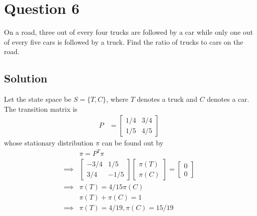 \section*{Question 6}

On a road, three out of every four trucks are followed by a car while only one out of every five cars is followed by a truck.
Find the ratio of trucks to cars on the road.

\subsection*{Solution}

Let the state space be \( S = \{ T, C \} \), where \( T \) denotes a truck and \( C \) denotes a car.
The transition matrix is
\begin{align*}
    P
     & =
    \begin{bmatrix}
        1/4 & 3/4 \\
        1/5 & 4/5
    \end{bmatrix}
\end{align*}
whose stationary distribution \( \pi \) can be found out by
\begin{align*}
     &
    \pi
    =
    P^T \pi
    \\
    \implies
     &
    \begin{bmatrix}
        -3/4 & 1/5  \\
        3/4  & -1/5
    \end{bmatrix}
    \begin{bmatrix}
        \pi(T) \\
        \pi(C)
    \end{bmatrix}
    =
    \begin{bmatrix}
        0 \\
        0
    \end{bmatrix}
    \\
    \implies
     &
    \pi(T) = 4/15 \pi(C)
    \\
     &
    \pi(T) + \pi(C) = 1
    \\
    \implies
     &
    \boxed{
        \pi(T) = 4/19, \pi(C) = 15/19
    }
\end{align*}
